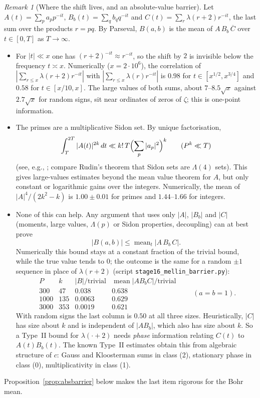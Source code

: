 \documentclass[11pt]{amsart}
\theoremstyle{definition}
\theoremstyle{remark}
\newtheorem{remark}[theorem]{Remark}
\begin{document}
\begin{remark}[Where the shift lives, and an absolute-value barrier]\label{rem:mellin}
Let $A(t)=\sum_pa_pp^{-it}$, $B_b(t)=\sum_qb_qq^{-it}$ and $C(t)=\sum_{r}\lambda(r+2)r^{-it}$, the last sum over the products $r=pq$. By Parseval, $B(a,b)$ is the mean of $A\,B_b\,\overline C$ over $t\in[0,T]$ as $T\to\infty$.
\begin{itemize}
\item For $|t|\ll x$ one has $(r+2)^{-it}\approx r^{-it}$, so the shift by $2$ is invisible below the frequency $t\asymp x$. Numerically ($x=2\cdot10^6$), the correlation of $|\sum_{r\le x}\lambda(r+2)r^{-it}|$ with $|\sum_{r\le x}\lambda(r)r^{-it}|$ is $0.98$ for $t\in[x^{1/2},x^{3/4}]$ and $0.58$ for $t\in[x/10,x]$. The large values of both sums, about $7$--$8.5\sqrt x$ against $2.7\sqrt x$ for random signs, sit near ordinates of zeros of $\zeta$; this is one-point information.
\item The primes are a multiplicative Sidon set. By unique factorisation,
\[
\int_T^{2T}|A(t)|^{2k}\,dt\ll k!\,T\Bigl(\sum_p|a_p|^2\Bigr)^k\qquad(P^k\ll T)
\] (see, e.g., \cite{Sou09}; compare Rudin's theorem \cite{Rud60} that Sidon sets are $\Lambda(4)$ sets). This gives large-values estimates beyond the mean value theorem for $A$, but only constant or logarithmic gains over the integers. Numerically, the mean of $|A|^4/(2k^2-k)$ is $1.00\pm0.01$ for primes and $1.44$--$1.66$ for integers.
\item None of this can help. Any argument that uses only $|A|$, $|B_b|$ and $|C|$ (moments, large values, $\Lambda(p)$ or Sidon properties, decoupling) can at best prove
\[
|B(a,b)|\le\operatorname{mean}_t|A\,B_b\,C| .
\]
Numerically this bound stays at a constant fraction of the trivial bound, while the true value tends to $0$; the outcome is the same for a random $\pm1$ sequence in place of $\lambda(r+2)$ (script \texttt{stage16\_mellin\_barrier.py}):
\[
\begin{array}{rrcc}
P & k & |B|/\text{trivial} & \operatorname{mean}|AB_bC|/\text{trivial}\\
300 & 47 & 0.038 & 0.638\\
1000 & 135 & 0.0063 & 0.629\\
3000 & 353 & 0.0019 & 0.621
\end{array}
\qquad(a=b=1).
\]
With random signs the last column is $0.50$ at all three sizes. Heuristically, $|C|$ has size about $k$ and is independent of $|AB_b|$, which also has size about $k$. So a Type~II bound for $\lambda(\cdot+2)$ needs \emph{phase} information relating $C(t)$ to $A(t)B_b(t)$. The known Type~II estimates obtain this from algebraic structure of $c$: Gauss and Kloosterman sums in class (2), stationary phase in class (0), multiplicativity in class (1).
\end{itemize}
Proposition~\ref{prop:absbarrier} below makes the last item rigorous for the Bohr mean.
\end{remark}
\end{document}
